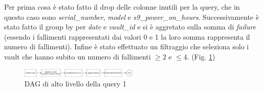 \documentclass[conference]{IEEEtran}
\begin{document}
Per prima cosa è stato fatto il drop delle colonne inutili per la query, che in questo caso sono \textit{serial\_number}, \textit{model} e \textit{s9\_power\_on\_hours}. Successivamente è stato fatto il group by per \textit{date} e \textit{vault\_id} e si è aggretato sulla somma di \textit{failure} (essendo i fallimenti rappresentati dai valori 0 e 1 la loro somma rappresenta il numero di fallimenti). Infine è stato effettuato un filtraggio che seleziona solo i vault che hanno subito un numero di fallimenti $\geq2$ e $\leq4$. (Fig. \ref{fig:dag_query1})
\begin{figure}[H]
    \centerline{\includegraphics[width=0.5\textwidth]{res/query1_dag.png}}
    \caption{DAG di alto livello della query 1}
    \label{fig:dag_query1}
\end{figure}
\end{document}
